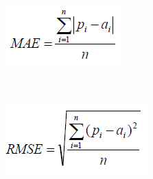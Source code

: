 \documentclass[a4paper,12pt, english]{article}
\begin{document}
\begin{enumerate}
\begin{enumerate}
      
\begin{figure}[h]
        \centering
        \begin{subfigure}[b]{0.23\textwidth}
                \includegraphics[width=\textwidth]{figs/MAE}
                \label{fig:mae}
        \end{subfigure} \quad %
        ~ %
        \begin{subfigure}[b]{0.23\textwidth}
                \includegraphics[width=\textwidth]{figs/RMSE}
                \label{fig:rmse}
        \end{subfigure} 
        

\end{figure}
\end{enumerate}
\end{enumerate}
\end{document}
